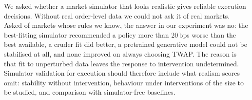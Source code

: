 We asked whether a market simulator that looks realistic gives reliable execution decisions. Without real order-level data we could not ask it of real markets. Asked of markets whose rules we know, the answer in our experiment was no: the best-fitting simulator recommended a policy more than 20\,bps worse than the best available, a cruder fit did better, a pretrained generative model could not be stabilised at all, and none improved on always choosing TWAP. The reason is that fit to unperturbed data leaves the response to intervention undetermined. Simulator validation for execution should therefore include what realism scores omit: stability without intervention, behaviour under interventions of the size to be studied, and comparison with simulator-free baselines.

